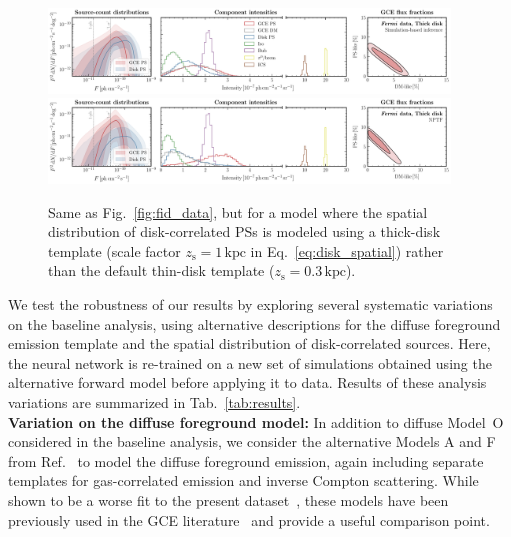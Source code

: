 \documentclass[prd,aps,10pt,nofootinbib,twocolumn,superscriptaddress,preprintnumbers,balancelastpage,longbibliography,floatfix]{revtex4-2}
\begin{document}
%
\begin{figure}
\centering
\includegraphics[width=0.95\textwidth]{plots/data_fid_sbi_thick.pdf}
\includegraphics[width=0.95\textwidth]{plots/data_fid_nptf_thick.pdf}
\caption{Same as Fig.~\ref{fig:fid_data}, but for a model where the spatial distribution of disk-correlated PSs is modeled using a thick-disk template (scale factor $z_\mathrm{s}=1\,\mathrm{kpc}$ in Eq.~\eqref{eq:disk_spatial}) rather than the default thin-disk template ($z_\mathrm{s}=0.3\,\mathrm{kpc}$).}
\label{fig:fid_data_thick_disk}
\end{figure}
%

We test the robustness of our results by exploring several systematic variations on the baseline analysis, using alternative descriptions for the diffuse foreground emission template and the spatial distribution of disk-correlated sources. Here, the neural network is re-trained on a new set of simulations obtained using the alternative forward model before applying it to \Fermi data. Results of these analysis variations are summarized in Tab.~\ref{tab:results}. \\

\noindent
\textbf{Variation on the diffuse foreground model:}
In addition to diffuse {Model~O} considered in the baseline analysis, we consider the alternative Models A and F from Ref.~\cite{Calore:2014xka} to model the diffuse foreground emission, again including separate templates for gas-correlated emission and inverse Compton scattering. While shown to be a worse fit to the present dataset~\cite{Buschmann:2020adf}, these models have been previously used in the GCE literature~\cite{Buschmann:2020adf,Leane:2020pfc,Leane:2020nmi} and provide a useful comparison point.
\end{document}
